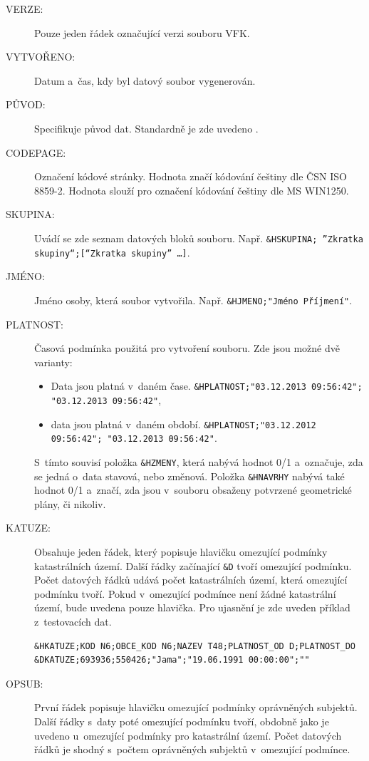\documentclass[a4paper,12pt,oneside]{book}
\begin{document}
\begin{description}
 \item[VERZE:] Pouze jeden řádek označující verzi souboru VFK.
 \item[VYTVOŘENO:] Datum a~čas, kdy byl datový soubor vygenerován.
 \item[PŮVOD:] Specifikuje původ dat. Standardně je zde uvedeno .
 \item[CODEPAGE:] Označení kódové stránky. Hodnota  značí kódování češtiny dle ČSN ISO 8859-2. Hodnota  slouží pro označení kódování češtiny dle MS WIN1250.
 \item[SKUPINA:] Uvádí se zde seznam datových bloků souboru. Např. \texttt{\&HSKUPINA; ”Zkratka skupiny“;[“Zkratka skupiny” \dots]}.
 \item[JMÉNO:] Jméno osoby, která soubor vytvořila. Např. \texttt{\&HJMENO;"Jméno Příjmení"}.
 \item[PLATNOST:] Časová podmínka použitá pro vytvoření souboru. Zde jsou možné dvě varianty:
 
 \begin{itemize}
  \item Data jsou platná v~daném čase. \texttt{\&HPLATNOST;"03.12.2013 09:56:42"; "03.12.2013 09:56:42"},
  \item data jsou platná v~daném období. \texttt{\&HPLATNOST;"03.12.2012 09:56:42"; "03.12.2013 09:56:42"}.
 \end{itemize}
 
 S~tímto souvisí položka \texttt{\&HZMENY}, která nabývá hodnot 0/1 a~označuje, zda se jedná o~data stavová, nebo změnová. Položka \texttt{\&HNAVRHY} nabývá také hodnot 0/1 a~značí, zda jsou v~souboru obsaženy potvrzené geometrické plány, či nikoliv.
 
 \item[KATUZE:] Obsahuje jeden řádek, který popisuje hlavičku omezující podmínky katastrálních území. Další řádky začínající \texttt{\&D} tvoří omezující podmínku. Počet datových řádků udává počet katastrálních území, která omezující podmínku tvoří. Pokud v~omezující podmínce není žádné katastrální území, bude uvedena pouze hlavička. Pro ujasnění je zde uveden příklad z~testovacích dat.
 
 \begin{lstlisting}
&HKATUZE;KOD N6;OBCE_KOD N6;NAZEV T48;PLATNOST_OD D;PLATNOST_DO
&DKATUZE;693936;550426;"Jama";"19.06.1991 00:00:00";""
 \end{lstlisting}

 \item[OPSUB:] První řádek popisuje hlavičku omezující podmínky oprávněných subjektů. Další řádky s~daty poté omezující podmínku tvoří, obdobně jako je uvedeno u~omezující podmínky pro katastrální území. Počet datových řádků je shodný s~počtem oprávněných subjektů v~omezující podmínce.
 

\end{description}
\end{document}
